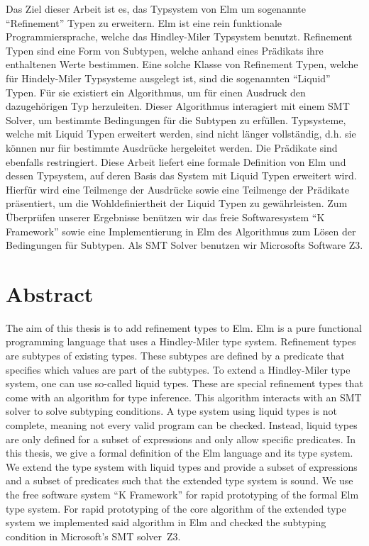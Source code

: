 Das Ziel dieser Arbeit ist es, das Typsystem von Elm um sogenannte \enquote{Refinement} Typen zu erweitern. Elm ist eine rein funktionale Programmiersprache, welche das Hindley-Miler Typsystem benutzt. Refinement Typen sind eine Form von Subtypen, welche anhand eines Prädikats ihre enthaltenen Werte bestimmen. Eine solche Klasse von Refinement Typen, welche für Hindely-Miler Typsysteme ausgelegt ist, sind die sogenannten \enquote{Liquid} Typen. Für sie existiert ein Algorithmus, um für einen Ausdruck den dazugehörigen Typ herzuleiten. Dieser Algorithmus interagiert mit einem SMT Solver, um bestimmte Bedingungen für die Subtypen zu erfüllen. Typsysteme, welche mit Liquid Typen erweitert werden, sind nicht länger vollständig, d.h. sie können nur für bestimmte Ausdrücke hergeleitet werden. Die Prädikate sind ebenfalls restringiert.
Diese Arbeit liefert eine formale Definition von Elm und dessen Typsystem, auf deren Basis das System mit Liquid Typen erweitert wird. Hierfür wird eine Teilmenge der Ausdrücke sowie eine Teilmenge der Prädikate präsentiert, um die Wohldefiniertheit der Liquid Typen zu gewährleisten. Zum Überprüfen unserer Ergebnisse benützen wir das freie Softwaresystem \enquote{K Framework} sowie eine Implementierung in Elm des Algorithmus zum Lösen der Bedingungen für Subtypen. Als SMT Solver benutzen wir Microsofts Software Z3.
\newpage

\section*{Abstract}

The aim of this thesis is to add refinement types to Elm. Elm is a pure functional programming language that uses a Hindley-Miler type system. Refinement types are subtypes of existing types. These subtypes are defined by a predicate that specifies which values are part of the subtypes. To extend a Hindley-Miler type system, one can use so-called liquid types. These are special refinement types that come with an algorithm for type inference. This algorithm interacts with an SMT solver to solve subtyping conditions. A type system using liquid types is not complete, meaning not every valid program can be checked. Instead, liquid types are only defined for a subset of expressions and only allow specific predicates.
In this thesis, we give a formal definition of the Elm language and its type system. We extend the type system with liquid types and provide a subset of expressions and a subset of predicates such that the extended type system is sound. We use the free software system \enquote{K Framework} for rapid prototyping of the formal Elm type system. For rapid prototyping of the core algorithm of the extended type system we implemented said algorithm in Elm and checked the subtyping condition in Microsoft's SMT solver~Z3.

